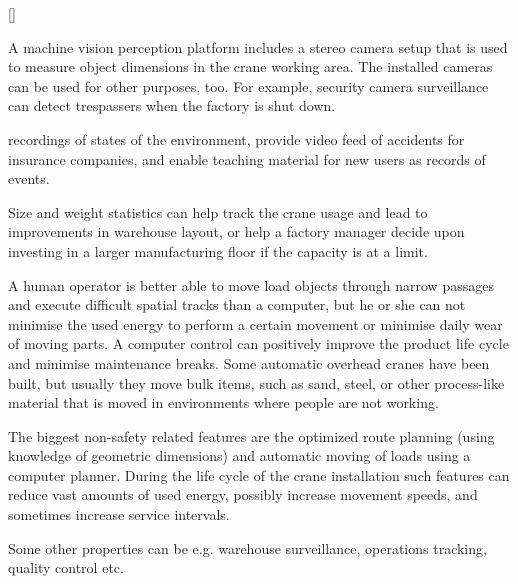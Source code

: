 \documentclass[12pt,a4paper,oneside,pdftex]{report}
\begin{document}
\ref{}

A machine vision perception platform includes a stereo camera setup that is used to measure object dimensions in the crane working area. The installed cameras can be used for other purposes, too. For example, security camera surveillance can detect trespassers when the factory is shut down. 

recordings of states of the environment, provide video feed of accidents for insurance companies, and enable teaching material for new users as records of events. 



Size and weight statistics can help track the crane usage and lead to improvements in warehouse layout, or help a factory manager decide upon investing in a larger manufacturing floor if the capacity is at a limit.

A human operator is better able to move load objects through narrow passages and execute difficult spatial tracks than a computer, but he or she can not minimise the used energy to perform a certain movement or minimise daily wear of moving parts. A computer control can positively improve the product life cycle and minimise maintenance breaks. 
Some automatic overhead cranes have been built, but usually they move bulk items, such as sand, steel, or other process-like material that is moved in environments where people are not working.




The biggest non-safety related features are the optimized route planning (using knowledge of geometric dimensions) and automatic moving of loads using a computer planner. During the life cycle of the crane installation such features can reduce vast amounts of used energy, possibly increase movement speeds, and sometimes increase service intervals.
 
 
 
 Some other properties can be e.g. warehouse surveillance, operations tracking, quality control etc.
 




\end{document}
